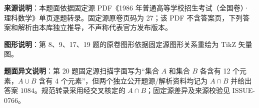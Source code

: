 


\begin{gktip}
\textbf{来源说明}：本题面依据固定源 PDF《1986 年普通高等学校招生考试（全国卷）·理科数学》单页逐题转录。固定源原卷页码为 27；该 PDF 不含答案页，下列答案和解析由本库独立推导，不声称代表官方发布版本。

\textbf{图形说明}：第 8、9、17、19 题的原卷图形依据固定源图形关系重绘为 TikZ 矢量图。

\textbf{题面异文说明}：第 20 题固定源扫描字面写为“集合 $A$ 和集合 $B$ 各含有 12 个元素，$A\cup B$ 含有 4 个元素”，但两个独立公开题源/解析资料均记为 $A\cap B$ 并给出答案 $1084$。规范转录采用经交叉核定的 $A\cap B$；固定源差异及来源校验见 ISSUE-0766。
\end{gktip}

